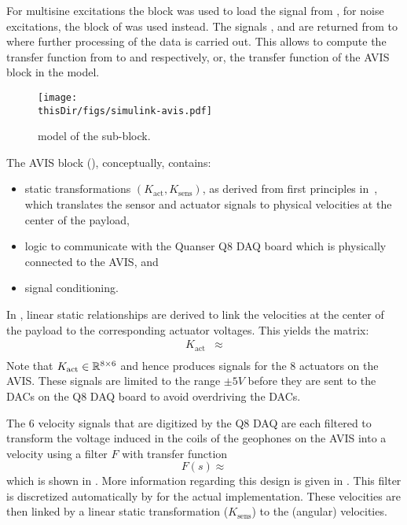 For multisine excitations the  block was used to load the  signal from \MATLAB, for noise excitations, the  block of \Simulink was used instead.
The signals ,  and  are returned from \Simulink to \MATLAB where further processing of the data is carried out.
This allows to compute the transfer function from  to  and  respectively, or, the transfer function of the \gls{AVIS} block in the \Simulink model.

\begin{figure}[p]
\setlength\figurewidth{\columnwidth}
  \texttt{[image: \\thisDir/figs/simulink-avis.pdf]}
  \caption{\Simulink model of the  sub-block.}
  \label{fig:avis:simulink:avis}
\end{figure}

The \gls{AVIS} block (), conceptually, contains:
\begin{itemize}
  \item static transformations $(K_{\mathrm{act}}, K_{\mathrm{sens}})$, as derived from first principles in~\citep{Rademakers2005MSc}, which translates the sensor and actuator signals to physical velocities at the center of the payload,
  \item logic to communicate with the Quanser Q8 \gls{DAQ} board which is physically connected to the \gls{AVIS}, and
  \item signal conditioning.
\end{itemize}

In \citet[Appendix A.4]{Rademakers2005MSc}, linear static relationships are derived to link the velocities at the center of the payload to the corresponding actuator voltages.
This yields the matrix:
\begin{align}
  K_{\mathrm{act}}    & \approx \\
\end{align}
Note that $K_{\mathrm{act}} \in \mathbb{R}^{8\times6}$ and hence produces signals for the $8$ actuators on the \gls{AVIS}.
These signals are limited to the range $\pm 5\unit{V}$ before they are sent to the \glspl{DAC} on the Q8 \gls{DAQ} board to avoid overdriving the \glspl{DAC}.

The $6$ velocity signals that are digitized by the Q8 \gls{DAQ} are each filtered to transform the voltage induced in the coils of the geophones on the \gls{AVIS} into a velocity using a filter $F$ with transfer function
\begin{equation}
  F(s) \approx 
\end{equation}
which is shown in .
More information regarding this design is given in \citep[Appendix A.3]{Rademakers2005MSc}.
This filter is discretized automatically by \Simulink for the actual implementation.
These velocities are then linked by a linear static transformation ($K_{\mathrm{sens}}$) to the (angular) velocities.

